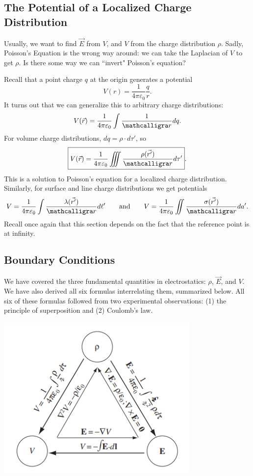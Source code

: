 \subsection{The Potential of a Localized Charge Distribution}

Usually, we want to find $\vec{E}$ from $V$, and $V$ from the charge distribution $\rho$. Sadly, Poisson's Equation is the wrong way around: we can take the Laplacian of $V$ to get $\rho$. Is there some way we can ``invert" Poisson's equation?

Recall that a point charge $q$ at the origin generates a potential
\[V(r)=\frac{1}{4\pi\varepsilon_0}\frac{q}{r}.\]
It turns out that we can generalize this to arbitrary charge distributions:
\[V(\vec{r})=\frac{1}{4\pi\varepsilon_0}\int\frac{1}{\scr}dq.\]
For volume charge distributions, $dq=\rho\cdot d\tau'$, so
\[\boxed{V(\vec{r})=\frac{1}{4\pi\varepsilon_0}\iiint\frac{\rho(\vec{r'})}{\scr}d\tau'}.\]
This is a solution to Poisson's equation for a localized charge distribution. Similarly, for surface and line charge distributions we get potentials
\[V=\frac{1}{4\pi\varepsilon_0}\int\frac{\lambda(\vec{r'})}{\scr}d\ell'\qquad\text{and}\qquad V=\frac{1}{4\pi\varepsilon_0}\iint\frac{\sigma(\vec{r'})}{\scr}da'.\]
Recall once again that this section depends on the fact that the reference point is at infinity.

\subsection{Boundary Conditions}\label{boundcond}

We have covered the three fundamental quantities in electrostatics: $\rho$, $\vec{E}$, and $V$. We have also derived all six formulas interrelating them, summarized below. All six of these formulas followed from two experimental observations: (1) the principle of superposition and (2) Coulomb's law.

\begin{center}
    \includegraphics[width=10cm]{Electrodynamics/images/fig2.35.PNG}
\end{center}

